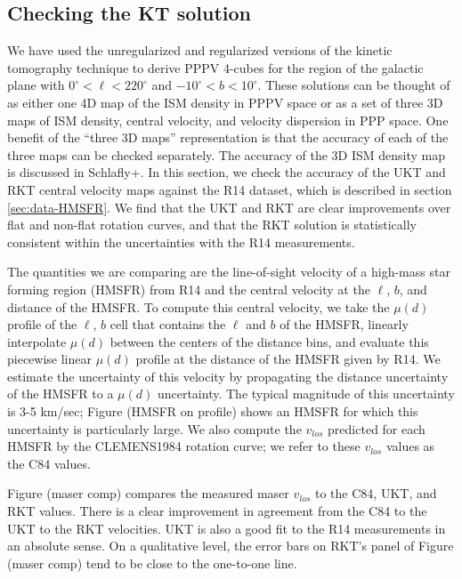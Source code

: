 \subsection{Checking the KT solution}
\label{sec:KT-validation}

We have used the unregularized and regularized versions of the kinetic tomography technique to derive PPPV 4-cubes for the region of the galactic plane with $0^\circ < \ell < 220^\circ$ and $-10^\circ < b < 10^\circ$. %
These solutions can be thought of as either one 4D map of the ISM density in PPPV space or as a set of three 3D maps of ISM density, central velocity, and velocity dispersion in PPP space. One benefit of the ``three 3D maps'' representation is that the accuracy of each of the three maps can be checked separately. The accuracy of the 3D ISM density map is discussed in Schlafly+. In this section, we check the accuracy of the UKT and RKT central velocity maps against the R14 dataset, which is described in section \ref{sec:data-HMSFR}. We find that the UKT and RKT are clear improvements over flat and non-flat rotation curves, and that the RKT solution is statistically consistent within the uncertainties with the R14 measurements. 

The quantities we are comparing are the line-of-sight velocity of a high-mass star forming region (HMSFR) from R14 and the central velocity at the $\ell$, $b$, and distance of the HMSFR. To compute this central velocity, we take the $\mu(d)$ profile of the $\ell$, $b$ cell that contains the $\ell$ and $b$ of the HMSFR, linearly interpolate $\mu(d)$ between the centers of the distance bins, and evaluate this piecewise linear $\mu(d)$ profile at the distance of the HMSFR given by R14. We estimate the uncertainty of this velocity by propagating the distance uncertainty of the HMSFR to a $\mu(d)$ uncertainty. The typical magnitude of this uncertainty is 3-5 km/sec; Figure (HMSFR on profile) shows an HMSFR for which this uncertainty is particularly large. We also compute the $v_{los}$ predicted for each HMSFR by the CLEMENS1984 rotation curve; we refer to these $v_{los}$ values as the C84 values. 

Figure (maser comp) compares the measured maser $v_{los}$ to the C84, UKT, and  RKT values. There is a clear improvement in agreement from the C84 to the UKT to the RKT velocities. UKT is also a good fit to the R14 measurements in an absolute sense. On a qualitative level, the error bars on RKT's panel of Figure (maser comp) tend to be close to the one-to-one line. 

